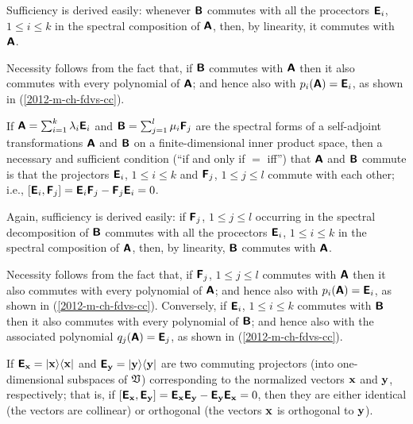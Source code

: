 {\color{OliveGreen}\bproof
Sufficiency is derived easily: whenever   $\textsf{\textbf{B}}$
commutes with all the procectors $\textsf{\textbf{E}}_i$, $1\le i\le k$
in the spectral composition of   $\textsf{\textbf{A}}$,
then, by linearity, it commutes with $\textsf{\textbf{A}}$.

Necessity follows from the fact that, if  $\textsf{\textbf{B}}$
commutes with  $\textsf{\textbf{A}}$
then it also commutes with every polynomial of  $\textsf{\textbf{A}}$;
and hence also with $p_i(\textsf{\textbf{A}})=\textsf{\textbf{E}}_i$,
as shown in (\ref{2012-m-ch-fdvs-cc}).
\eproof
}

If $\textsf{\textbf{A}}=\sum_{i=1}^k \lambda_i\textsf{\textbf{E}}_i$
and
$\textsf{\textbf{B}}=\sum_{j=1}^l \mu_i\textsf{\textbf{F}}_j$
are the spectral forms of a self-adjoint transformations
$\textsf{\textbf{A}}$ and $\textsf{\textbf{B}}$
on a finite-dimensional inner product space,
then a necessary and sufficient condition (``if and only if $=$ iff'')
that  $\textsf{\textbf{A}}$ and
 $\textsf{\textbf{B}}$ commute
is that the projectors
$\textsf{\textbf{E}}_i$, $1\le i\le k$
and
$\textsf{\textbf{F}}_j$, $1\le j\le l$
commute with each other; i.e.,
$\left[\textsf{\textbf{E}}_i,\textsf{\textbf{F}}_j\right] =
\textsf{\textbf{E}}_i \textsf{\textbf{F}}_j-
\textsf{\textbf{F}}_j\textsf{\textbf{E}}_i =0 $.

{\color{OliveGreen}\bproof
Again, sufficiency is derived easily: if $\textsf{\textbf{F}}_j$, $1\le j\le l$
occurring in the spectral decomposition of $\textsf{\textbf{B}}$
commutes with all the procectors $\textsf{\textbf{E}}_i$, $1\le i\le k$
in the spectral composition of   $\textsf{\textbf{A}}$,
then, by linearity, $\textsf{\textbf{B}}$ commutes with $\textsf{\textbf{A}}$.

Necessity follows from the fact that, if $\textsf{\textbf{F}}_j$, $1\le j\le l$
commutes with  $\textsf{\textbf{A}}$
then it also commutes with every polynomial of  $\textsf{\textbf{A}}$;
and
hence also with $p_i(\textsf{\textbf{A}})=\textsf{\textbf{E}}_i$,
as shown in (\ref{2012-m-ch-fdvs-cc}).
Conversely,
if $\textsf{\textbf{E}}_i$, $1\le i\le k$
commutes with  $\textsf{\textbf{B}}$
then it also commutes with every polynomial of  $\textsf{\textbf{B}}$;
and
hence also with the associated polynomial
$q_j(\textsf{\textbf{A}})=\textsf{\textbf{E}}_j$,
as shown in (\ref{2012-m-ch-fdvs-cc}).
\eproof
}



If
$\textsf{\textbf{E}}_{\bf x} = \vert {\bf x} \rangle \langle {\bf x} \vert$
and
$\textsf{\textbf{E}}_{\bf y} = \vert {\bf y} \rangle \langle {\bf y} \vert$
are two commuting projectors (into one-dimensional subspaces of ${\frak V}$)
corresponding to the normalized vectors ${\bf x}$  and ${\bf y}$,
respectively; that is, if
$\left[
\textsf{\textbf{E}}_{\bf x}
,
\textsf{\textbf{E}}_{\bf y}
\right]=
\textsf{\textbf{E}}_{\bf x}
\textsf{\textbf{E}}_{\bf y}
-
\textsf{\textbf{E}}_{\bf y}
\textsf{\textbf{E}}_{\bf x}
=0$,
then they are either identical (the vectors are collinear) or orthogonal (the vectors ${\bf x}$ is orthogonal to ${\bf y}$).


